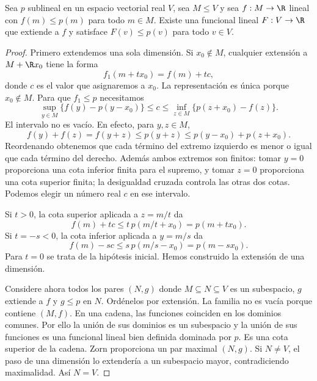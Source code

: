 \begin{teorema}\label{ch21:hb-real}
Sea $p$ sublineal en un espacio vectorial real $V$, sea $M\leq V$ y sea $f:M\to\R$ lineal con $f(m)\leq p(m)$ para todo $m\in M$. Existe una funcional lineal $F:V\to\R$ que extiende a $f$ y satisface $F(v)\leq p(v)$ para todo $v\in V$.
\end{teorema}
\begin{proof}
Primero extendemos una sola dimensión. Si $x_0\notin M$, cualquier extensión a $M+\R x_0$ tiene la forma
\[
 f_1(m+tx_0)=f(m)+tc,
\]
donde $c$ es el valor que asignaremos a $x_0$. La representación es única porque $x_0\notin M$. Para que $f_1\leq p$ necesitamos
\[
 \sup_{y\in M}\{f(y)-p(y-x_0)\}\leq c
 \leq\inf_{z\in M}\{p(z+x_0)-f(z)\}.
\]
El intervalo no es vacío. En efecto, para $y,z\in M$,
\[
 f(y)+f(z)=f(y+z)\leq p(y+z)
 \leq p(y-x_0)+p(z+x_0).
\]
Reordenando obtenemos que cada término del extremo izquierdo es menor o igual que cada término del derecho. Además ambos extremos son finitos: tomar $y=0$ proporciona una cota inferior finita para el supremo, y tomar $z=0$ proporciona una cota superior finita; la desigualdad cruzada controla las otras dos cotas. Podemos elegir un número real $c$ en ese intervalo.

Si $t>0$, la cota superior aplicada a $z=m/t$ da
\[
 f(m)+tc\leq t\,p(m/t+x_0)=p(m+tx_0).
\]
Si $t=-s<0$, la cota inferior aplicada a $y=m/s$ da
\[
 f(m)-sc\leq s\,p(m/s-x_0)=p(m-sx_0).
\]
Para $t=0$ se trata de la hipótesis inicial. Hemos construido la extensión de una dimensión.

Considere ahora todos los pares $(N,g)$ donde $M\subseteq N\subseteq V$ es un subespacio, $g$ extiende a $f$ y $g\leq p$ en $N$. Ordénelos por extensión. La familia no es vacía porque contiene $(M,f)$. En una cadena, las funciones coinciden en los dominios comunes. Por ello la unión de sus dominios es un subespacio y la unión de sus funciones es una funcional lineal bien definida dominada por $p$. Es una cota superior de la cadena. Zorn proporciona un par maximal $(N,g)$. Si $N\ne V$, el paso de una dimensión lo extendería a un subespacio mayor, contradiciendo maximalidad. Así $N=V$.
\end{proof}

